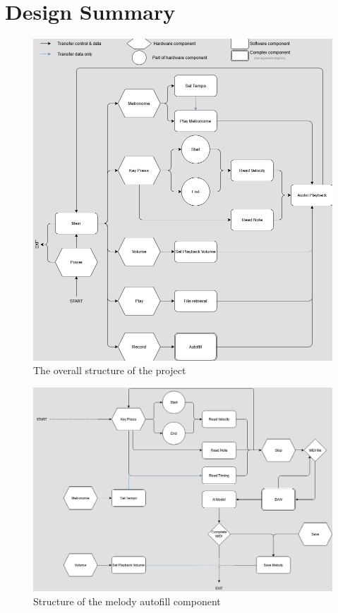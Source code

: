 \section{Design Summary}
\blindtext
\begin{figure}[h!]
  \centering
  \includegraphics[width=\linewidth]{image/Keyboard.png}
  \caption{The overall structure of the project}
  \label{fig:keyboard_diagram}
\end{figure}
\begin{figure}[h!]
  \centering
  \includegraphics[width=\linewidth]{image/Autofill.png}
  \caption{Structure of the melody autofill component}
  \label{fig:autofill_diagram}
\end{figure}
